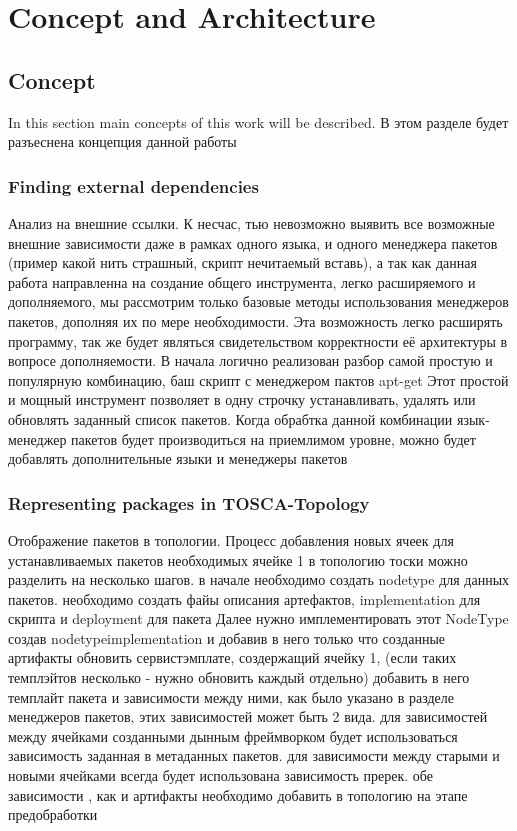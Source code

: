 
\chapter{Concept and Architecture}\label{chap:conarch}
\section{Concept}
In this section main concepts of this work will be described.
В этом разделе будет разъеснена концепция данной работы

\fi
\subsection*{Finding external dependencies}
Анализ на внешние ссылки. 
К несчас, тью невозможно выявить все возможные внешние зависимости даже в рамках одного языка, и одного менеджера пакетов (пример какой нить страшный, скрипт нечитаемый вставь), а так как данная работа направленна на создание общего инструмента, легко расширяемого и дополняемого, мы рассмотрим только базовые методы использования менеджеров пакетов, дополняя их по мере необходимости. Эта возможность легко расширять программу, так же будет являться свидетельством корректности её архитектуры в вопросе дополняемости.
В начала логично реализован разбор самой простую и популярную комбинацию, баш скрипт с менеджером пактов apt-get 
Этот простой и мощный инструмент позволяет в одну строчку устанавливать, удалять или обновлять заданный список пакетов.
Когда обрабтка данной комбинации язык-менеджер пакетов будет производиться на приемлимом уровне, можно будет добавлять дополнительные языки и менеджеры пакетов

\fi
\subsection*{Representing packages in TOSCA-Topology}
Отображение пакетов в топологии. Процесс добавления новых ячеек для устанавливаемых пакетов необходимых ячейке 1 в топологию тоски можно разделить на несколько шагов. 
в начале необходимо создать nodetype для данных пакетов. 
необходимо создать файы описания артефактов, implementation для скрипта и deployment для пакета
Далее нужно имплементировать этот NodeType  создав nodetypeimplementation и добавив в него только что созданные артифакты
обновить сервистэмплате, создержащий ячейку 1, (если таких темплэйтов несколько - нужно обновить каждый отдельно)
добавить в него темплайт пакета и зависимости между ними, как было указано в разделе менеджеров пакетов, этих зависимостей может быть 2 вида. 
для зависимостей между ячейками созданными дынным фреймворком будет использоваться зависимость заданная в метаданных пакетов.
для зависимости между старыми и новыми ячейками всегда будет использована зависимость пререк.
обе зависимости , как и артифакты необходимо добавить в топологию на этапе предобработки

